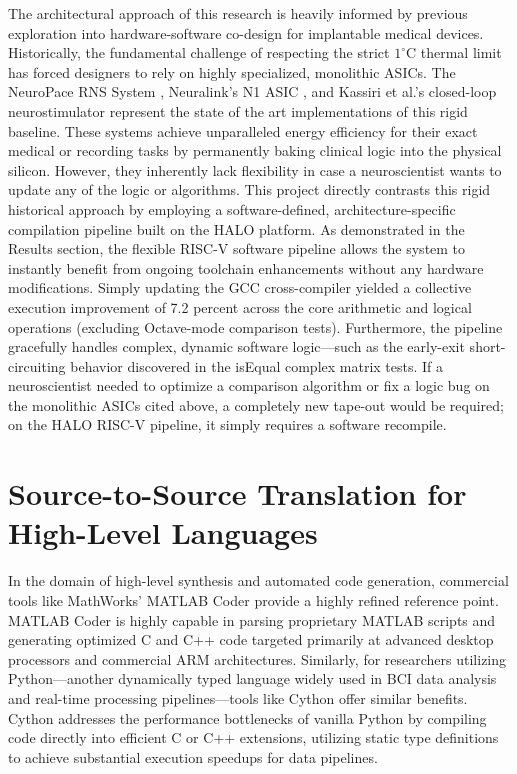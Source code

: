 


The architectural approach of this research is heavily informed by previous exploration into hardware-software co-design for implantable medical devices. Historically, the fundamental challenge of respecting the strict $1 ^\circ$C thermal limit has forced designers to rely on highly specialized, monolithic ASICs. The NeuroPace RNS System \cite{Heck2014}, Neuralink's N1 ASIC \cite{Musk2019}, and Kassiri et al.'s closed-loop neurostimulator \cite{7982670} represent the state of the art implementations of this rigid baseline. These systems achieve unparalleled energy efficiency for their exact medical or recording tasks by permanently baking clinical logic into the physical silicon. However, they inherently lack flexibility in case a neuroscientist wants to update any of the logic or algorithms. This project directly contrasts this rigid historical approach by employing a software-defined, architecture-specific compilation pipeline built on the HALO platform. As demonstrated in the Results section, the flexible RISC-V software pipeline allows the system to instantly benefit from ongoing toolchain enhancements without any hardware modifications. Simply updating the GCC cross-compiler yielded a collective execution improvement of 7.2 percent across the core arithmetic and logical operations (excluding Octave-mode comparison tests). Furthermore, the pipeline gracefully handles complex, dynamic software logic—such as the early-exit short-circuiting behavior discovered in the isEqual complex matrix tests. If a neuroscientist needed to optimize a comparison algorithm or fix a logic bug on the monolithic ASICs cited above, a completely new tape-out would be required; on the HALO RISC-V pipeline, it simply requires a software recompile.

\section{Source-to-Source Translation for High-Level Languages}

In the domain of high-level synthesis and automated code generation, commercial tools like MathWorks' MATLAB Coder \cite{mathworks_matlab_coder} provide a highly refined reference point. MATLAB Coder is highly capable in parsing proprietary MATLAB scripts and generating optimized C and C++ code targeted primarily at advanced desktop processors and commercial ARM architectures. Similarly, for researchers utilizing Python—another dynamically typed language widely used in BCI data analysis and real-time processing pipelines—tools like Cython \cite{behnel2011cython} offer similar benefits. Cython addresses the performance bottlenecks of vanilla Python by compiling code directly into efficient C or C++ extensions, utilizing static type definitions to achieve substantial execution speedups for data pipelines.

